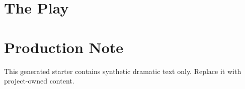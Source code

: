 \documentclass[10pt,twoside,openany]{book}
\begin{document}
\PSEBeginFrontMatter
\PSETitlePage
\PSEPublicationPage

\PSEPrintCastList
\tableofcontents
\clearpage
\PSEBeginBody
\chapter{The Play}

\PSEBeginBackMatter
\chapter*{Production Note}
This generated starter contains synthetic dramatic text only. Replace it with project-owned content.
\PSEPrintIndex
\end{document}
